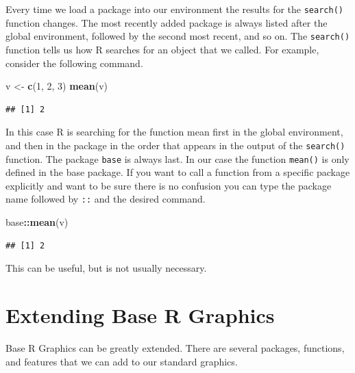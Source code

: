 \documentclass[
]{book}
\newenvironment{Shaded}{\begin{snugshade}}{\end{snugshade}}
\newcommand{\DecValTok}[1]{\textcolor[rgb]{0.00,0.00,0.81}{#1}}
\newcommand{\KeywordTok}[1]{\textcolor[rgb]{0.13,0.29,0.53}{\textbf{#1}}}
\newcommand{\NormalTok}[1]{#1}
\newcommand{\OperatorTok}[1]{\textcolor[rgb]{0.81,0.36,0.00}{\textbf{#1}}}
\newcommand{\StringTok}[1]{\textcolor[rgb]{0.31,0.60,0.02}{#1}}
\begin{document}
Every time we load a package into our environment the results for the \texttt{search()} function changes. The most recently added package is always listed after the global environment, followed by the second most recent, and so on.
The \texttt{search()} function tells us how R searches for an object that we called. For example, consider the following command.

\begin{Shaded}
\begin{Highlighting}[]
\NormalTok{v <-}\StringTok{ }\KeywordTok{c}\NormalTok{(}\DecValTok{1}\NormalTok{, }\DecValTok{2}\NormalTok{, }\DecValTok{3}\NormalTok{)}
\KeywordTok{mean}\NormalTok{(v)}
\end{Highlighting}
\end{Shaded}

\begin{verbatim}
## [1] 2
\end{verbatim}

In this case R is searching for the function mean first in the global environment, and then in the package in the order that appears in the output of the \texttt{search()} function. The package \texttt{base} is always last. In our case the function \texttt{mean()} is only defined in the base package. If you want to call a function from a specific package explicitly and want to be sure there is no confusion you can type the package name followed by \texttt{::} and the desired command.

\begin{Shaded}
\begin{Highlighting}[]
\NormalTok{base}\OperatorTok{::}\KeywordTok{mean}\NormalTok{(v)}
\end{Highlighting}
\end{Shaded}

\begin{verbatim}
## [1] 2
\end{verbatim}

This can be useful, but is not usually necessary.

\hypertarget{extending-base-r-graphics}{%
\chapter{Extending Base R Graphics}\label{extending-base-r-graphics}}

Base R Graphics can be greatly extended. There are several packages, functions, and features that we can add to our standard graphics.
\end{document}
